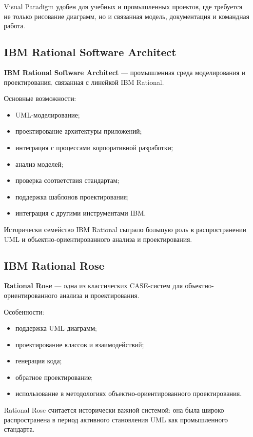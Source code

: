 \documentclass[12pt,a4paper]{article}
\begin{document}
Visual Paradigm удобен для учебных и промышленных проектов, где требуется не только рисование диаграмм, но и связанная модель, документация и командная работа.

\subsection{IBM Rational Software Architect}

\textbf{IBM Rational Software Architect} --- промышленная среда моделирования и проектирования, связанная с линейкой IBM Rational.

Основные возможности:
\begin{itemize}
    \item UML-моделирование;
    \item проектирование архитектуры приложений;
    \item интеграция с процессами корпоративной разработки;
    \item анализ моделей;
    \item проверка соответствия стандартам;
    \item поддержка шаблонов проектирования;
    \item интеграция с другими инструментами IBM.
\end{itemize}

Исторически семейство IBM Rational сыграло большую роль в распространении UML и объектно-ориентированного анализа и проектирования.

\subsection{IBM Rational Rose}

\textbf{Rational Rose} --- одна из классических CASE-систем для объектно-ориентированного анализа и проектирования.

Особенности:
\begin{itemize}
    \item поддержка UML-диаграмм;
    \item проектирование классов и взаимодействий;
    \item генерация кода;
    \item обратное проектирование;
    \item использование в методологиях объектно-ориентированного проектирования.
\end{itemize}

Rational Rose считается исторически важной системой: она была широко распространена в период активного становления UML как промышленного стандарта.
\end{document}
